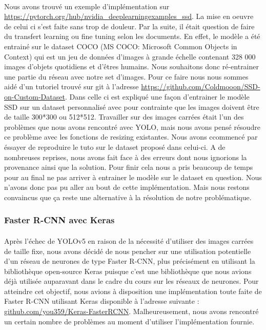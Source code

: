 \paragraph{} Nous avons trouvé un exemple d'implémentation sur \url{https://pytorch.org/hub/nvidia_deeplearningexamples_ssd}. La mise en oeuvre de celui ci s'est faite sans trop de douleur. Par la suite, il était question de faire du transfert learning ou fine tuning selon les documents. En effet, le modèle a été entrainé sur le dataset COCO (MS COCO: Microsoft Common Objects in Context) qui est un jeu de données d'images à grande échelle contenant 328 000 images d'objets quotidiens et d'êtres humains. Nous souhaitons donc ré-entrainer une partie du réseau avec notre set d'images. Pour ce faire nous nous sommes aidé d'un tutoriel trouvé sur git à l'adresse \url{https://github.com/Coldmooon/SSD-on-Custom-Dataset}. Dans celle ci est expliqué une façon d'entrainer le modèle SSD sur un dataset personnalisé avec pour contrainte que les images doivent être de taille 300*300 ou 512*512. Travailler sur des images carrées était l'un des problèmes que nous avons rencontré avec YOLO, mais nous avons pensé résoudre ce problème avec les fonctions de resizing existantes. 
Nous avons ccommencé par éssayer de reproduire le tuto sur le dataset proposé dans celui-ci. A de nombreuses reprises, nous avons fait face à des erreurs dont nous ignorions la provenance ainsi que la solution. Pour finir cela nous a pris beaucoup de temps pour au final ne pas arriver à entrainer le modèle sur le dataset en question. Nous n'avons donc pas pu aller au bout de cette implémentation. Mais nous restons convaincus que ça reste une alternative à la résolution de notre problématique.

\subsubsection{Faster R-CNN avec Keras}

\paragraph{} Après l'échec de YOLOv5 en raison de la nécessité d'utiliser des images carrées de taille fixe, nous avons décidé de nous pencher sur une utilisation potentielle d'un réseau de neurones de type Faster R-CNN, plus précisément en utilisant la bibliothèque open-source Keras puisque c'est une bibliothèque que nous avions déjà utilisée auparavant dans le cadre du cours sur les réseaux de neurones. Pour atteindre cet objectif, nous avions à disposition une implémentation toute faite de Faster R-CNN utilisant Keras disponible à l'adresse suivante : \url{github.com/you359/Keras-FasterRCNN}. Malheureusement, nous avons rencontré un certain nombre de problèmes au moment d'utiliser l'implémentation fournie.

